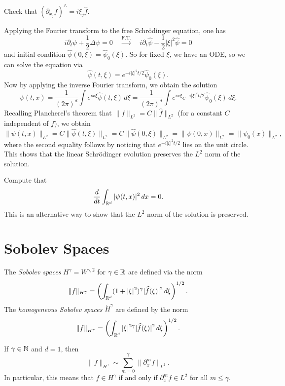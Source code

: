 \begin{exercise}
  Check that $(\partial_{x_j} f)^\wedge = i \xi_j \widehat{f}$.
\end{exercise}

Applying the Fourier transform to the free Schr\"odinger
equation, one has
\[
  i \partial_t \psi + \frac{1}{2} \Delta \psi = 0 \quad
  \xrightarrow{\text{F.T.}} \quad
  i \partial_t \widehat{\psi} - \frac{1}{2} |\xi|^2 \widehat{\psi} = 0
\]
and initial condition $\widehat{\psi}(0, \xi) = \widehat{\psi}_0(\xi)$.
So for fixed $\xi$, we have an ODE, so we
can solve the equation via
\[
  \widehat{\psi}(t, \xi) =
  e^{-i |\xi|^2 t / 2} \widehat{\psi}_0(\xi).
\]
Now by applying the inverse Fourier transform, we obtain
the solution
\[
  \psi(t, x) = \frac{1}{(2\pi)^d} \int e^{ix\xi} \widehat{\psi}(t, \xi)\, d\xi
  = \frac{1}{(2\pi)^d} \int e^{ix\xi} e^{-i |\xi|^2 t / 2} \widehat{\psi}_0(\xi)\, d\xi.
\]
Recalling Plancherel's theorem that
$\|f\|_{L^2} = C\|\widehat{f}\|_{L^2}$ (for a constant
$C$ independent of $f$), we obtain
\[
  \|\psi(t, x)\|_{L^2}
  = C\|\widehat{\psi}(t, \xi)\|_{L^2}
  = C\|\widehat{\psi}(0, \xi)\|_{L^2}
  = \|\psi(0, x)\|_{L^2}
  = \|\psi_0(x)\|_{L^2},
\]
where the second equality follows by noticing that
$e^{-i |\xi|^2 t / 2}$ lies on the unit circle. This
shows that the linear Schr\"odinger
evolution preserves the $L^2$ norm of the solution.

\begin{exercise}
  Compute that
  \[
    \frac{d}{dt} \int_{\mathbb{R}^d} |\psi(t, x)|^2\, dx = 0.
  \]
  This is an alternative way to show that
  the $L^2$ norm of the solution is preserved.
\end{exercise}

\section{Sobolev Spaces}
\begin{definition}
  The \emph{Sobolev spaces} $H^{\gamma} = W^{\gamma, 2}$
  for $\gamma \in \mathbb{R}$
  are defined via the norm
  \[
    \|f\|_{H^{\gamma}}
    = \left(\int_{\mathbb{R}^d} (1 + |\xi|^2)^\gamma |\widehat{f}(\xi)|^2\, d\xi\right)^{1 / 2}.
  \]
  The \emph{homogeneous Sobolev spaces} $\dot{H}^\gamma$
  are defined by the norm
  \[
    \|f\|_{\dot{H}^\gamma}
    = \left(\int_{\mathbb{R}^d} |\xi|^{2\gamma} |\widehat{f}(\xi)|^2\, d\xi\right)^{1 / 2}.
  \]
\end{definition}

\begin{remark}
  If $\gamma \in \mathbb{N}$ and $d = 1$, then
  \[
    \|f\|_{H^{\gamma}}
    \sim \sum_{m = 0}^\gamma \| \partial_x^m f \|_{L^2}.
  \]
  In particular, this means that
  $f \in H^\gamma$ if and only if
  $\partial_x^m f \in L^2$ for all $m \le \gamma$.
\end{remark}


